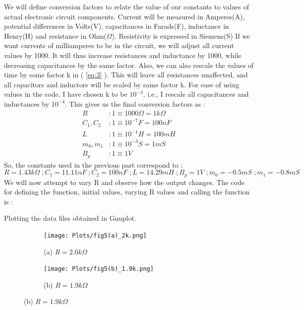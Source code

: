 \documentclass[12pt]{article}
\newcommand*{\myref}[1]{%
  \begingroup
    \hypersetup{
      linkcolor=linkequation,
      linkbordercolor=linkequation,
    }%
    \ref{#1}%
  \endgroup
}
\begin{document}
We will define conversion factors to relate the value of our constants to values of actual electronic circuit components. Current will be measured in Amperes(A), potential differences in Volts(V), capacitances in Farads(F), inductance in Henry(H) and resistance in Ohm($\Omega$). Resistivity is expressed in Siemens(S)\linebreak
If we want currents of milliamperes to be in the circuit, we will adjust all current values by 1000. It will thus increase resistances and inductance by 1000, while decreasing capacitances by the same factor. Also, we can also rescale the values of time by some factor k in (\myref{eq:3}). This will leave all resistances unaffected, and all capacitors and inductors will be scaled by same factor k. For ease of using values in the code, I have chosen k to be $10^{-4}$, i.e., I rescale all capacitances and inductances by $10^{-4}$. This gives us the final conversion factors as :
\begin{align*}
	R & : 1 \equiv 1000 \Omega = 1k\Omega \\
	C_1, C_2 & : 1 \equiv 10^{-7} F = 100 nF \\
	L & : 1 \equiv 10^{-1} H = 100 mH \\
	m_0, m_1 & : 1 \equiv 10^{-3} S = 1 mS \\
	B_p & : 1 \equiv 1 V
\end{align*}
So, the constants used in the previous part correspond to :
\begin{equation*}
	R=1.43k\Omega \; ;  C_1=11.11 nF \; ; C_2=100 nF \; ; L=14.29 mH \; ; B_p = 1V \; ; m_0 = -0.5 mS \; ; m_1 = -0.8 mS
\end{equation*}
We will now attempt to vary R and observe how the output changes. \linebreak
The code for defining the function, initial values, varying R values and calling the function is :

Plotting the data files obtained in Gnuplot. 
\begin{figure}[H] %
	\centering
	\caption{Fig 5. R Bifurcation in Theoretical Chua Circuit using a Three Segment Non-Linear Resistance}
	\begin{subfigure}[b]{0.5\textwidth}
		\centering
		\texttt{[image: Plots/fig5(a)\_2k.png]}
		\caption{(a) $R=2.0k\Omega$}
	\end{subfigure}%
	\begin{subfigure}[b]{0.5\textwidth}
		\centering
		\texttt{[image: Plots/fig5(b)\_1.9k.png]}
		\caption{(b) $R=1.9k\Omega$}
	\end{subfigure}
\end{figure}
\end{document}
